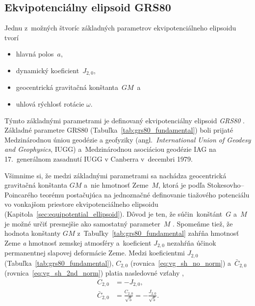 \documentclass[a4paper,12pt]{book}
\begin{document}
\subsection{Ekvipotenciálny elipsoid GRS80}
\label{sec:grs80}

Jednu z~možných štvoríc základných parametrov ekvipotenciálneho elipsoidu tvorí
%
\begin{itemize}
\item hlavná polos~$a$,
%
\item dynamický koeficient~$J_{2,0}$,
%
\item geocentrická gravitačná konštanta~$GM$~a
%
\item uhlová rýchlosť rotácie $\omega$.
\end{itemize}
%
Týmto základnými parametrami je definovaný ekvipotenciálny elipsoid 
\emph{GRS80} \parencite[angl. \textit{Geodetic Reference 
System~1980};][]{GRS80}.  Základné parametre GRS80 
(Tabuľka~\ref{tab:grs80_fundamental}) boli prijaté Medzinárodnou úniou geodézie 
a geofyziky (angl.~\textit{International Union of Geodesy and Geophysics}, 
IUGG) a~Medzinárodnou asociáciou geodézie IAG na 17.~generálnom zasadnutí IUGG 
v Canberra v~decembri 1979.

Všimnime si, že medzi základnými parametrami sa nachádza geocentrická 
gravitačná konštanta $GM$ a~nie hmotnosť Zeme~$M$, ktorá je podľa 
Stokesovho--Poincarého teorému postačujúca na jednoznačné definovanie tiažového 
potenciálu vo vonkajšom priestore ekvipotenciálneho elipsoidu 
(Kapitola~\ref{sec:equipotential_ellipsoid}).  Dôvod je ten, že 
súčin~konštánt~$G$ a~$M$ je možné určiť presnejšie ako samostatný parameter~$M$ 
\parencite[pozri napríklad][]{Pick2000}.  Spomeňme tiež, že hodnota konštanty 
$GM$ z~Tabuľky~\ref{tab:grs80_fundamental} zahŕňa hmotnosť Zeme \emph{a} 
hmotnosť zemskej atmosféry a~koeficient $J_{2,0}$ nezahŕňa účinok permanentnej 
slapovej deformácie Zeme.  Medzi koeficientmi $J_{2,0}$ 
(Tabuľka~\ref{tab:grs80_fundamental}), $C_{2,0}$ 
(rovnica~\ref{eq:vg_sh_no_norm}) a~$\bar{C}_{2,0}$ 
(rovnica~\ref{eq:vg_sh_2nd_norm}) platia nasledovné vzťahy 
\parencite{Moritz1967,MoritzPhysicalGeodesy},
%
\begin{align}
\label{eq:c20_j20}
C_{2,0} &= -J_{2,0}{,}\\
%
\label{eq:c20_j20_2}
\bar{C}_{2,0} &= \frac{C_{2,0}}{\sqrt{5}} = -\frac{J_{2,0}}{\sqrt{5}}{.}
\end{align}
\end{document}
